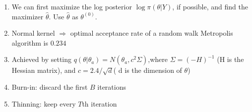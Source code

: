 \documentclass[10pt]{article} %
\begin{document}
\begin{multicols}{4}
{\begin{flushleft}
\begin{enumerate}
                \item We can first maximize the log posterior \(\log \pi(\theta|Y)\), if possible, and find the maximizer \(\hat{\theta}\). Use \(\hat{\theta}\) as \(\theta^{(0)}\).
                \item Normal kernel \(\Rightarrow\) optimal acceptance rate of a random walk Metropolis algorithm is \(0.234\)
                \item Achieved by setting \(q(\theta|\theta_a) = N(\theta_a, c^2\Sigma)\),where \(\Sigma = (-H)^{-1}\) (H is the Hessian matrix), and \(c = 2.4/\sqrt{d}\)( d is the dimension of \(\theta\))
                \item Burn-in: discard the first \(B\) iterations
                \item Thinning: keep every \(T\)th iteration
            \end{enumerate}
        \end{flushleft}

}
\end{multicols}
\end{document}
